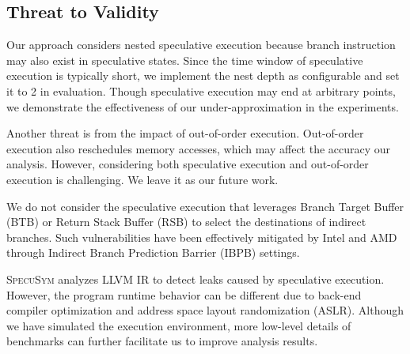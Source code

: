 \documentclass[sigconf]{acmart}
\newcommand{\SpecuSym}{\textsc{SpecuSym} }
\begin{document}
\begin{table}%
\caption{Overall performance Increases from Optimization. }
\label{tbl:opt}
\centering
{}
\end{table}



\subsection{Threat to Validity}
\label{sec:threat}
Our approach considers nested speculative execution because branch 
instruction may also exist in speculative states. Since the time window 
of speculative execution is typically short, we implement the nest depth 
as configurable and set it to 2 in evaluation. Though speculative execution 
may end at arbitrary points, we demonstrate the effectiveness of our
under-approximation in the experiments. 

Another threat is from the impact 
of out-of-order execution. Out-of-order execution also reschedules memory 
accesses, which may affect the accuracy our analysis. However, considering 
both speculative execution and out-of-order execution is challenging. We 
leave it as our future work. 

We do not consider the speculative execution 
that leverages Branch Target Buffer (BTB) or Return Stack Buffer (RSB) to 
select the destinations of indirect branches. Such vulnerabilities have 
been effectively mitigated by Intel and AMD through Indirect Branch 
Prediction Barrier (IBPB) settings.

\SpecuSym analyzes LLVM IR to detect leaks caused by speculative execution. 
However, the program runtime behavior can be different due to back-end 
compiler optimization and address space layout randomization (ASLR). 
Although we have simulated the execution environment, more low-level 
details of benchmarks can further facilitate us to improve analysis 
results.
\end{document}
